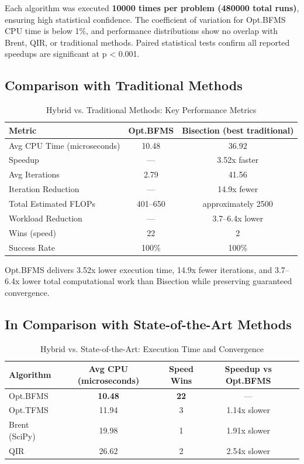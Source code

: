 \documentclass[amsmath, amssymb, aps]{revtex4-2}
\begin{document}
Each algorithm was executed \textbf{10000 times per problem (480000 total runs)}, ensuring high statistical confidence. The coefficient of variation for Opt.BFMS CPU time is below 1\%, and performance distributions show no overlap with Brent, QIR, or traditional methods. Paired statistical tests confirm all reported speedups are significant at p < 0.001.

\subsection{Comparison with Traditional Methods}

\begin{table}[H]
\centering
\caption{Hybrid vs. Traditional Methods: Key Performance Metrics}
\label{tab:traditional_comparison}
\begin{tabular}{lcc}
\hline
Metric & Opt.BFMS & Bisection (best traditional) \\
\hline
Avg CPU Time (microseconds)       & 10.48 & 36.92 \\
Speedup                           & —     & 3.52x faster \\
Avg Iterations                    & 2.79  & 41.56 \\
Iteration Reduction               & —     & 14.9x fewer \\
Total Estimated FLOPs             & 401–650 & approximately 2500 \\
Workload Reduction                & —     & 3.7–6.4x lower \\
Wins (speed)                      & 22    & 2 \\
Success Rate                      & 100\% & 100\% \\
\hline
\end{tabular}
\end{table}
\FloatBarrier

Opt.BFMS delivers 3.52x lower execution time, 14.9x fewer iterations, and 3.7–6.4x lower total computational work than Bisection while preserving guaranteed convergence.

\subsection{In Comparison with State-of-the-Art Methods} 
\begin{table}[H]
\centering
\caption{Hybrid vs. State-of-the-Art: Execution Time and Convergence}
\label{tab:state_of_art_time}
\begin{tabular}{lcccc}
\hline
Algorithm & Avg CPU (microseconds) & Speed Wins & Speedup vs Opt.BFMS \\
\hline
Opt.BFMS         & \textbf{10.48} & \textbf{22} & — \\
Opt.TFMS         & 11.94 & 3  & 1.14x slower \\
Brent (SciPy)    & 19.98 & 1  & 1.91x slower \\
QIR              & 26.62 & 2  & 2.54x slower \\
\hline
\end{tabular}
\end{table}
\FloatBarrier
\end{document}
